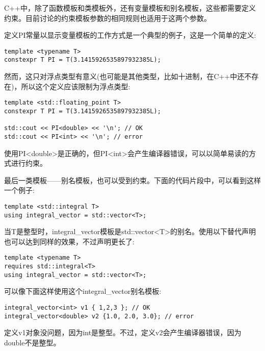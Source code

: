 C++中，除了函数模板和类模板外，还有变量模板和别名模板，这些都需要定义约束。目前讨论的约束模板参数的相同规则也适用于这两个参数。

定义PI常量以显示变量模板的工作方式是一个典型的例子，这是一个简单的定义:

\begin{lstlisting}[style=styleCXX]
template <typename T>
constexpr T PI = T(3.1415926535897932385L);
\end{lstlisting}

然而，这只对浮点类型有意义(也可能是其他类型，比如十进制，在C++中还不存在)，所以这个定义应该限制为浮点类型:

\begin{lstlisting}[style=styleCXX]
template <std::floating_point T>
constexpr T PI = T(3.1415926535897932385L);

std::cout << PI<double> << '\n'; // OK
std::cout << PI<int> << '\n'; // error
\end{lstlisting}

使用PI<double>是正确的，但PI<int>会产生编译器错误，可以以简单易读的方式进行约束。

最后一类模板——别名模板，也可以受到约束。下面的代码片段中，可以看到这样一个例子:

\begin{lstlisting}[style=styleCXX]
template <std::integral T>
using integral_vector = std::vector<T>;
\end{lstlisting}

当T是整型时，integral\_vector模板是std::vector<T>的别名。使用以下替代声明也可以达到同样的效果，不过声明更长了:

\begin{lstlisting}[style=styleCXX]
template <typename T>
requires std::integral<T>
using integral_vector = std::vector<T>;
\end{lstlisting}

可以像下面这样使用这个integral\_vector别名模板:

\begin{lstlisting}[style=styleCXX]
integral_vector<int> v1 { 1,2,3 }; // OK
integral_vector<double> v2 {1.0, 2.0, 3.0}; // error
\end{lstlisting}

定义v1对象没问题，因为int是整型。不过，定义v2会产生编译器错误，因为double不是整型。

